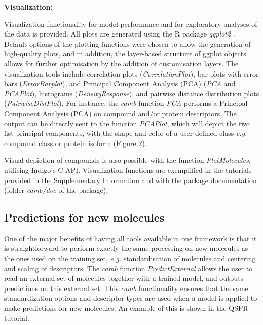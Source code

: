 \documentclass[twoside,a4wide,10pt]{article}
\begin{document}
{\bf Visualization:}

Visualization functionality for model performance and for exploratory analyses of the data is provided. 
All plots are generated using the R package {\it ggplot2} \citep{ggplot2}.
Default options of the plotting functions were chosen to allow the generation of high-quality plots,
and in addition, the layer-based structure of ggplot objects allows for further optimisation
by the addition of customisation layers.  
The visualization tools include correlation plots ({\it CorrelationPlot}),
bar plots with error bars ({\it ErrorBarplot}), and
Principal Component Analysis (PCA) ({\it PCA} and {\it PCAPlot}),
histograms ({\it DensityResponse}),
and pairwise distance distribution plots ({\it PairwiseDistPlot}).
For instance, the {\it camb} function {\it PCA} performs a Principal Component Analysis (PCA) 
on compound and/or protein descriptors.
The output can be directly sent to the function {\it PCAPlot},
which will depict the two fist principal components,
with the shape and color of a user-defined class
{\it e.g.} compound class or protein isoform (Figure 2).

Visual depiction of compounds is also possible with the function {\it PlotMolecules},
utilising Indigo's C API. 	
Visualization functions are exemplified in the tutorials provided in the Supplementary Information
and with the package documentation (folder {\it camb/doc} of the package).

\subsection{Predictions for new molecules}
One of the major benefits of having all tools available in one framework is that 
it is straightforward to perform exactly the same processing on new molecules as the ones used on the training set,
{\it e.g.} standardisation of molecules and centering and scaling of descriptors.
The {\it camb} function {\it PredictExternal} allows the user to read an external set of molecules together with a trained model, 
and outputs predictions on this external set. 
This {\it camb} functionality 
ensures that the same standardization options and descriptor types are used when a model is applied to make predictions for new molecules.
An example of this is shown in the QSPR tutorial.


\end{document}
